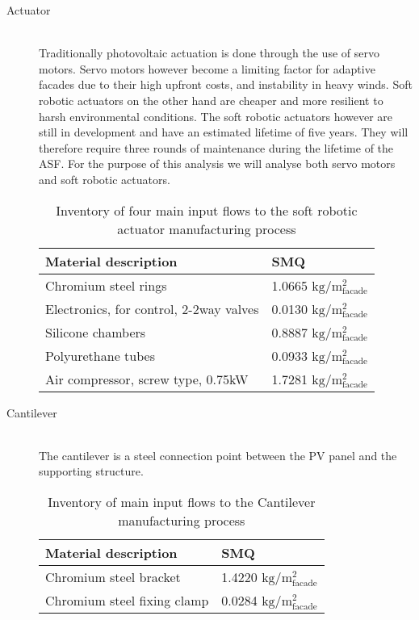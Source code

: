 \begin{description}
\item[Actuator] \hfill \\
Traditionally photovoltaic actuation is done through the use of servo motors. Servo motors however become a limiting factor for adaptive facades due to their high upfront costs, and instability in heavy winds. Soft robotic actuators on the other hand are cheaper and more resilient to harsh environmental conditions\cite{Svetozarevic2014a}. The soft robotic actuators however are still in development and have an estimated lifetime of five years. They will therefore require three rounds of maintenance during the lifetime of the ASF.
For the purpose of this analysis we will analyse both servo motors and soft robotic actuators. 

\begin{table}[H]
\centering
\begin{tabular}{ll}
\hline
Material description & SMQ \\ \hline
Chromium steel rings	 & 1.0665 ${\mathrm{kg/m^2_{facade}}}$ \\
Electronics, for control, 2-2way valves  & 0.0130  ${\mathrm{kg/m^2_{facade}}}$\\
Silicone chambers & 0.8887 ${\mathrm{kg/m^2_{facade}}}$\\
Polyurethane tubes &0.0933 ${\mathrm{kg/m^2_{facade}}}$\\
Air compressor, screw type, 0.75kW & 1.7281 ${\mathrm{kg/m^2_{facade}}}$\\
\hline
\end{tabular}
\caption{Inventory of four main input flows to the soft robotic actuator manufacturing process }
\label{tab:ActuatorInv}
\end{table}

\item[Cantilever] \hfill \\
The cantilever is a steel connection point between the PV panel and the supporting structure.\\

\begin{table}[H]
\centering
\begin{tabular}{ll}
\hline
Material description & SMQ \\ \hline
Chromium steel bracket	 & 1.4220 ${\mathrm{kg/m^2_{facade}}}$ \\
Chromium steel fixing clamp  & 0.0284 ${\mathrm{kg/m^2_{facade}}}$\\
\hline
\end{tabular}
\caption{Inventory of main input flows to the Cantilever manufacturing process }
\label{tab:CantileverInv}
\end{table}


\end{description}
